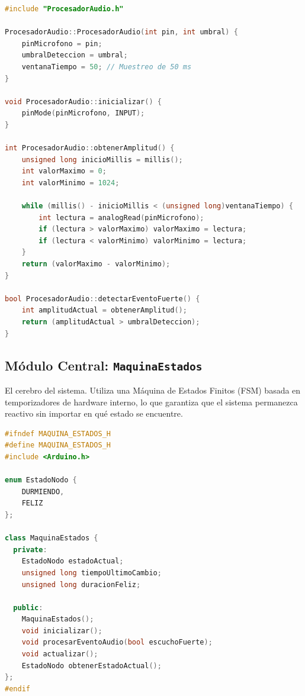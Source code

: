 \documentclass[10pt]{article}
\begin{document}
\begin{lstlisting}[language=C++, caption=lib/ProcesadorAudio/ProcesadorAudio.cpp]
#include "ProcesadorAudio.h"

ProcesadorAudio::ProcesadorAudio(int pin, int umbral) {
    pinMicrofono = pin;
    umbralDeteccion = umbral;
    ventanaTiempo = 50; // Muestreo de 50 ms
}

void ProcesadorAudio::inicializar() {
    pinMode(pinMicrofono, INPUT);
}

int ProcesadorAudio::obtenerAmplitud() {
    unsigned long inicioMillis = millis();
    int valorMaximo = 0;
    int valorMinimo = 1024;

    while (millis() - inicioMillis < (unsigned long)ventanaTiempo) {
        int lectura = analogRead(pinMicrofono);
        if (lectura > valorMaximo) valorMaximo = lectura;
        if (lectura < valorMinimo) valorMinimo = lectura;
    }
    return (valorMaximo - valorMinimo);
}

bool ProcesadorAudio::detectarEventoFuerte() {
    int amplitudActual = obtenerAmplitud();
    return (amplitudActual > umbralDeteccion);
}
\end{lstlisting}

\subsection{Módulo Central: \texttt{MaquinaEstados}}
El cerebro del sistema. Utiliza una Máquina de Estados Finitos (FSM) basada en temporizadores de hardware interno, lo que garantiza que el sistema permanezca reactivo sin importar en qué estado se encuentre.

\begin{lstlisting}[language=C++, caption=lib/MaquinaEstados/MaquinaEstados.h]
#ifndef MAQUINA_ESTADOS_H
#define MAQUINA_ESTADOS_H
#include <Arduino.h>

enum EstadoNodo {
    DURMIENDO,
    FELIZ
};

class MaquinaEstados {
  private:
    EstadoNodo estadoActual;
    unsigned long tiempoUltimoCambio;
    unsigned long duracionFeliz;

  public:
    MaquinaEstados();
    void inicializar();
    void procesarEventoAudio(bool escuchoFuerte);
    void actualizar();
    EstadoNodo obtenerEstadoActual();
};
#endif
\end{lstlisting}
\end{document}

